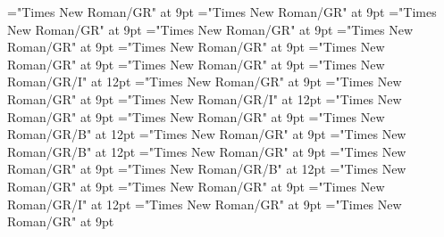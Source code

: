 \documentclass[gps1,twoside]{article}
\begin{document}
\font\spanspanformetymologysubentrysubentriesentrybefore="Times New Roman/GR" at 9pt
\font\spanformetymologysubentrysubentriesentrylastchildafter="Times New Roman/GR" at 9pt
\font\spanspanglossetymologysubentrysubentriesentrybefore="Times New Roman/GR" at 9pt
\font\spanglossetymologysubentrysubentriesentrylastchildafter="Times New Roman/GR" at 9pt
\font\spanspancommentetymologysubentrysubentriesentrybefore="Times New Roman/GR" at 9pt
\font\spancommentetymologysubentrysubentriesentrylastchildafter="Times New Roman/GR" at 9pt
\font\spanspanminimallexreferencessubentrysubentriesentrybefore="Times New Roman/GR" at 9pt
\font\minimallexreferencessubentrysubentriesentryafter="Times New Roman/GR" at 9pt
\font\spanenownertypeabbreviationminimallexreferenceminimallexreferencessubentrysubentriesentry="Times New Roman/GR/I" at 12pt
\font\spanspanownertypeabbreviationminimallexreferenceminimallexreferencessubentrysubentriesentrybefore="Times New Roman/GR" at 9pt
\font\spanownertypeabbreviationminimallexreferenceminimallexreferencessubentrysubentriesentrylastchildafter="Times New Roman/GR" at 9pt
\font\spanownertypeabbreviationminimallexreferenceminimallexreferencessubentrysubentriesentry="Times New Roman/GR/I" at 12pt
\font\configtargetconfigtargetconfigtargetsminimallexreferenceminimallexreferencessubentrysubentriesentrybefore="Times New Roman/GR" at 9pt
\font\configtargetsminimallexreferenceminimallexreferencessubentrysubentriesentryafter="Times New Roman/GR" at 9pt
\font\spanbzhheadwordconfigtargetconfigtargetsminimallexreferenceminimallexreferencessubentrysubentriesentry="Times New Roman/GR/B" at 12pt
\font\spanspanheadwordconfigtargetconfigtargetsminimallexreferenceminimallexreferencessubentrysubentriesentrybefore="Times New Roman/GR" at 9pt
\font\spanheadwordconfigtargetconfigtargetsminimallexreferenceminimallexreferencessubentrysubentriesentry="Times New Roman/GR/B" at 12pt
\font\spanspansensecontentspansensessubentrysubentriesentrybefore="Times New Roman/GR" at 9pt
\font\sensessubentrysubentriesentryafter="Times New Roman/GR" at 9pt
\font\sensenumbersensecontentsensessubentrysubentriesentry="Times New Roman/GR/B" at 12pt
\font\sensenumbersensecontentsensessubentrysubentriesentryafter="Times New Roman/GR" at 9pt
\font\morphosyntaxanalysissharedgrammaticalinfosensessubentrysubentriesentryafter="Times New Roman/GR" at 9pt
\font\morphosyntaxanalysissharedgrammaticalinfosensessubentrysubentriesentry="Times New Roman/GR/I" at 12pt
\font\spanspanpartofspeechmorphosyntaxanalysissharedgrammaticalinfosensessubentrysubentriesentrybefore="Times New Roman/GR" at 9pt
\font\spanpartofspeechmorphosyntaxanalysissharedgrammaticalinfosensessubentrysubentriesentrylastchildafter="Times New Roman/GR" at 9pt
\end{document}
